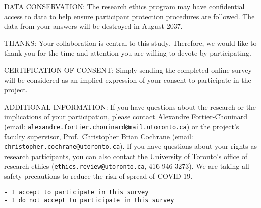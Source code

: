 \documentclass[
  letterpaper,
  DIV=11,
  numbers=noendperiod]{scrreprt}
\begin{document}
DATA CONSERVATION: The research ethics program may have confidential
access to data to help ensure participant protection procedures are
followed. The data from your answers will be destroyed in August 2037.

THANKS: Your collaboration is central to this study. Therefore, we would
like to thank you for the time and attention you are willing to devote
by participating.

CERTIFICATION OF CONSENT: Simply sending the completed online survey
will be considered as an implied expression of your consent to
participate in the project.

ADDITIONAL INFORMATION: If you have questions about the research or the
implications of your participation, please contact Alexandre
Fortier-Chouinard (email:
\texttt{alexandre.fortier.chouinard@mail.utoronto.ca}) or the project's
faculty supervisor, Prof.~Christopher Brian Cochrane (email:
\texttt{christopher.cochrane@utoronto.ca}). If you have questions about
your rights as research participants, you can also contact the
University of Toronto's office of research ethics
(\texttt{ethics.review@utoronto.ca}, 416-946-3273). We are taking all
safety precautions to reduce the risk of spread of COVID-19.

\begin{verbatim}
- I accept to participate in this survey
- I do not accept to participate in this survey
\end{verbatim}
\end{document}
